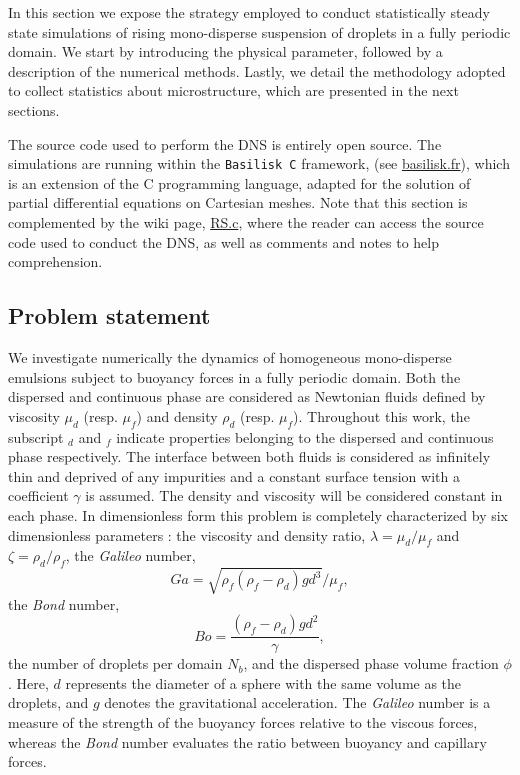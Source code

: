 In this section we expose the strategy employed to conduct statistically steady state simulations of rising mono-disperse suspension of droplets in a fully periodic domain. 
We start by introducing the physical parameter, followed by a description of the numerical methods.
Lastly, we detail the methodology adopted to collect statistics about microstructure, which are presented in the next sections.

The source code used to perform the DNS is entirely open source.
The simulations are running within the \texttt{Basilisk C} framework, (see \href{http://basilisk.fr}{basilisk.fr}), which is an extension of the C programming language, adapted for the solution of partial differential equations on Cartesian meshes. 
Note that this section is complemented by the wiki page, \href{http://basilisk.fr/sandbox/fintzin/Rising-Suspension/RS.c}{RS.c}, where the reader can access the source code used to conduct the DNS, as well as comments and notes to help comprehension. 

\subsection{Problem statement}

We investigate numerically the dynamics of homogeneous mono-disperse emulsions subject to buoyancy forces in a fully periodic domain. 
Both the dispersed and continuous phase are considered as Newtonian fluids defined by viscosity $\mu_d$ (resp. $\mu_f$) and density $\rho_d$ (resp. $\mu_f$).
Throughout this work, the subscript $_d$ and $_f$ indicate properties belonging to the dispersed and continuous phase respectively. 
The interface between both fluids is considered as infinitely thin and deprived of any impurities and a constant surface tension with a coefficient $\gamma$ is assumed. 
The density and viscosity will be considered constant in each phase.
In dimensionless form this problem is completely characterized by six dimensionless parameters :  the viscosity and density ratio, $\lambda = \mu_d / \mu_f$ and $\zeta = \rho_d / \rho_f$,  
the \textit{Galileo} number, 
\begin{equation*}
    Ga =\sqrt{\rho_f(\rho_f - \rho_d) g d^3} / \mu_f,
\end{equation*}
the \textit{Bond} number, 
\begin{equation*}
    Bo =\frac{(\rho_f - \rho_d) g d^2}{\gamma},
\end{equation*}
the number of droplets per domain $N_b$, and the dispersed phase volume fraction $\phi$. 
Here, $d$ represents the diameter of a sphere with the same volume as the droplets, and $g$ denotes the gravitational acceleration.
The \textit{Galileo} number is a measure of the strength of the buoyancy forces relative to the viscous forces, whereas the \textit{Bond} number evaluates the ratio between buoyancy and capillary forces. 

